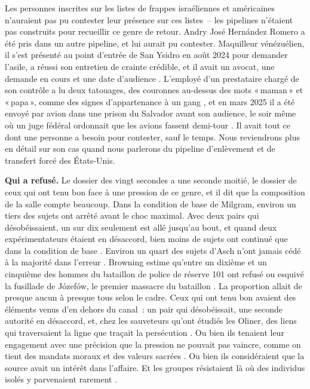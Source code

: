 Les personnes inscrites sur les listes de frappes israéliennes et américaines n'auraient pas pu contester leur présence sur ces listes~– les pipelines n'étaient pas construits pour recueillir ce genre de retour. Andry José Hernández Romero a été pris dans un autre pipeline, et lui aurait pu contester. Maquilleur vénézuélien, il s'est présenté au point d'entrée de San Ysidro en août 2024 pour demander l'asile, a réussi son entretien de crainte crédible, et il avait un avocat, une demande en cours et une date d'audience \autocite{LULAC2025HernandezRomero,Vega2025HernandezRomero}. L'employé d'un prestataire chargé de son contrôle a lu deux tatouages, des couronnes au-dessus des mots «\,maman\,» et «\,papa\,», comme des signes d'appartenance à un gang \autocite{Palomera2025Blade}, et en mars 2025 il a été envoyé par avion dans une prison du Salvador avant son audience, le soir même où un juge fédéral ordonnait que les avions fassent demi-tour \autocite{jgg2025contempt}. Il avait tout ce dont une personne a besoin pour contester, sauf le temps. Nous reviendrons plus en détail sur son cas quand nous parlerons du pipeline d'enlèvement et de transfert forcé des États-Unis.

\textbf{Qui a refusé.} Le dossier des vingt secondes a une seconde moitié, le dossier de ceux qui ont tenu bon face à une pression de ce genre, et il dit que la composition de la salle compte beaucoup. Dans la condition de base de Milgram, environ un tiers des sujets ont arrêté avant le choc maximal. Avec deux pairs qui désobéissaient, un sur dix seulement est allé jusqu'au bout, et quand deux expérimentateurs étaient en désaccord, bien moins de sujets ont continué que dans la condition de base \autocite{milgram1974obedience}. Environ un quart des sujets d'Asch n'ont jamais cédé à la majorité dans l'erreur \autocite{asch1956studies}. Browning estime qu'entre un dixième et un cinquième des hommes du bataillon de police de réserve 101 ont refusé ou esquivé la fusillade de Józefów, le premier massacre du bataillon \autocite{browning1992ordinary}. La proportion allait de presque aucun à presque tous selon le cadre. Ceux qui ont tenu bon avaient des éléments venus d'en dehors du canal~: un pair qui désobéissait, une seconde autorité en désaccord, et, chez les sauveteurs qu'ont étudiés les Oliner, des liens qui traversaient la ligne que traçait la persécution \autocite{oliner1988altruistic}. Ou bien ils tenaient leur engagement avec une précision que la pression ne pouvait pas vaincre, comme on tient des mandats moraux et des valeurs sacrées \autocite{skitka2009limits,ginges2007sacred}. Ou bien ils considéraient que la source avait un intérêt dans l'affaire. Et les groupes résistaient là où des individus isolés y parvenaient rarement \autocite{gamson1982encounters}.

